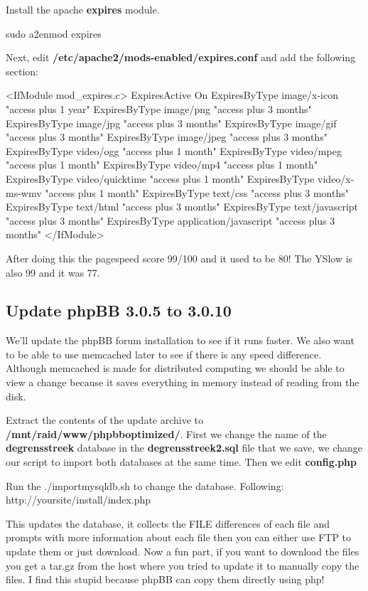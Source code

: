 Install the \gls{apache} \textbf{expires} module.\cite{optimizing_LAMP_helioviewer}
\begin{codelisting}
sudo a2enmod expires
\end{codelisting}
Next, edit \textbf{/etc/apache2/mods-enabled/expires.conf} and add the following section:
\begin{codelisting}
<IfModule mod_expires.c>
      ExpiresActive On
      ExpiresByType image/x-icon "access plus 1 year"
      ExpiresByType image/png "access plus 3 months"
      ExpiresByType image/jpg "access plus 3 months"
      ExpiresByType image/gif "access plus 3 months"
      ExpiresByType image/jpeg "access plus 3 months"
      ExpiresByType video/ogg "access plus 1 month"
      ExpiresByType video/mpeg "access plus 1 month"
      ExpiresByType video/mp4 "access plus 1 month"
      ExpiresByType video/quicktime "access plus 1 month"
      ExpiresByType video/x-ms-wmv "access plus 1 month"
      ExpiresByType text/css "access plus 3 months"
      ExpiresByType text/html "access plus 3 months"
      ExpiresByType text/javascript "access plus 3 months"
      ExpiresByType application/javascript "access plus 3 months"
</IfModule>
\end{codelisting}
After doing this the pagespeed score 99/100 and it used to be 80! The YSlow is also 99 and it was 77.
\clearpage{}
\subsection{Update phpBB 3.0.5 to 3.0.10}
We'll update the phpBB forum installation to see if it runs faster. We also want to be able to use \gls{memcached} later to see if there is any speed difference. Although \gls{memcached} is made for distributed computing we should be able to view a change because it saves everything in memory instead of reading from the disk.

Extract the contents of the update archive to \textbf{/mnt/raid/www/phpbboptimized/}.
First we change the name of the \textbf{degrensstreek} database in the \textbf{degrensstreek2.sql} file that we save, we change our script to import both databases at the same time.
Then we edit \textbf{config.php}
Run the ./importmysqldb.sh to change the database. Following: http://yoursite/install/index.php

This updates the database, it collects the FILE differences of each file and prompts with more information about each file then you can either use FTP to update them or just download.  Now a fun part, if you want to download the files you get a tar.gz from the host where you tried to update it to manually copy the files. I find this stupid because phpBB can copy them directly using \gls{php}!


